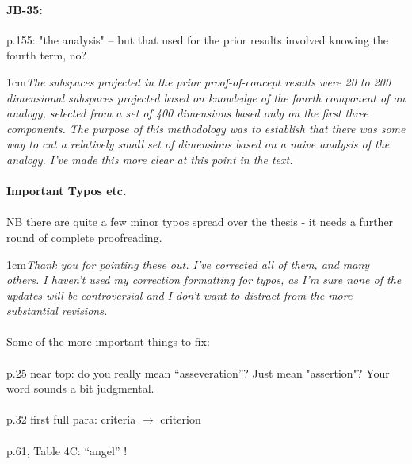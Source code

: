\documentclass[11pt,a4paper]{article}
\newcommand{\res}[1]{\vspace{0.25cm} \begin{adjustwidth}{1cm}{}\emph{#1}\end{adjustwidth}}
\begin{document}
\paragraph{JB-35:} p.155: "the analysis" -- but that used for the prior results involved knowing the fourth term, no?

\res{The subspaces projected in the prior proof-of-concept results were 20 to 200 dimensional subspaces projected based on knowledge of the fourth component of an analogy, selected from a set of 400 dimensions based only on the first three components.  The purpose of this methodology was to establish that there was some way to cut a relatively small set of dimensions based on a naive analysis of the analogy.  I've made this more clear at this point in the text.}

\paragraph{Important Typos etc.}

\paragraph{}NB there are quite a few minor typos spread over the thesis - it needs a further round of complete proofreading.

\res{Thank you for pointing these out.  I've corrected all of them, and many others.  I haven't used my correction formatting for typos, as I'm sure none of the updates will be controversial and I don't want to distract from the more substantial revisions.}

\paragraph{} Some of the more important things to fix:

\paragraph{} p.25 near top: do you really mean ``asseveration''? Just mean "assertion"? Your word sounds a bit judgmental.

\paragraph{} p.32 first full para:  criteria $\rightarrow$ criterion

\paragraph{} p.61, Table 4C: ``angel'' !
\end{document}

